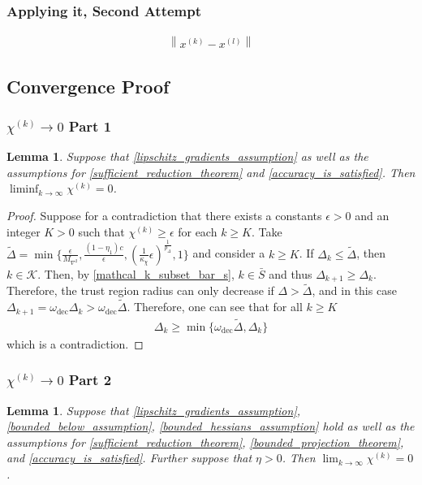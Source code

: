 \documentclass{article}
\newtheorem{lemma}[theorem]{Lemma}
\theoremstyle{case}
\numberwithin{theorem}{subsection}
\newcommand{\chik}{{\chi^{(k)}}}
\newcommand{\dk}{\Delta_k}
\newcommand{\dkpo}{\Delta_{k+1}}
\newcommand{\maxhessian}{{M_{\nabla^2}}}
\newcommand{\omegadec}{\omega_{\text{dec}}}
\newcommand{\xk}{{x^{(k)}}}
\newcommand{\xl}{{x^{(l)}}}
\begin{document}
\subsubsection{Applying it, Second Attempt}


\begin{align*}
\left\|\xk - \xl \right\|
\end{align*}


\subsection{Convergence Proof}
\subsubsection{$\chik \to 0$ Part 1}
\begin{lemma}
\label{liminf_chi_to_zero}
Suppose that \cref{lipschitz_gradients_assumption} as well as the assumptions for \cref{sufficient_reduction_theorem} and \cref{accuracy_is_satisfied}.
Then $\liminf_{k\to\infty} \chik = 0$.
\end{lemma}
 

\begin{proof}
Suppose for a contradiction that there exists a constants $\epsilon > 0$ and an integer $K > 0$ such that $\chik \ge \epsilon$ for each $k \ge K$.
Take $ \tilde \Delta = \min \{\frac{\epsilon}{\maxhessian}, \frac{(1 - \eta_1)c}{\epsilon}, \left(\frac 1 {\kappa_{\chi}}  \epsilon \right)^{\frac 1 {p_{\Delta}}}, 1\}$
and consider a $k \ge K$.
If $\dk \le \tilde \Delta$, then $k \in \mathcal K$.
Then, by \cref{mathcal_k_subset_bar_s},  $k \in \bar S$ and thus $\dkpo \ge \dk$.
Therefore, the trust region radius can only decrease if $\Delta > \tilde \Delta$, and in this case $\dkpo = \omegadec\dk > \omegadec \tilde \Delta$.
Therefore, one can see that for all $k \ge K$
\begin{align}
\dk \ge \min\{\omegadec \tilde \Delta, \dk \}
\end{align}
which is a contradiction.
\end{proof}



\subsubsection{$\chik \to 0$ Part 2}
\begin{lemma}
\label{lim_chi_to_zero}
Suppose that \cref{lipschitz_gradients_assumption}, \cref{bounded_below_assumption}, \cref{bounded_hessians_assumption} hold as well as the assumptions for 
\cref{sufficient_reduction_theorem}, \cref{bounded_projection_theorem}, and \cref{accuracy_is_satisfied}.
Further suppose that $\eta > 0$.
Then $\lim_{k\to\infty}\chik=0$.
\end{lemma}
\end{document}
